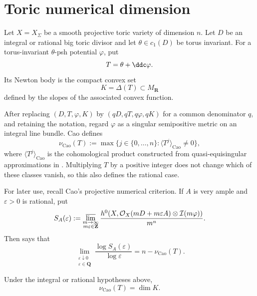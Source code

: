 \section{Toric numerical dimension}
\label{sec:verified-toric-dimension}

Let \(X=X_\Sigma\) be a smooth projective toric variety of dimension
\(n\). Let \(D\) be an integral or rational big toric divisor and let
\(\theta\in c_1(D)\) be torus invariant. For a torus-invariant
\(\theta\)-psh potential \(\varphi\), put
\[
                         T=\theta+\ddc\varphi.
\]
Its Newton body is the compact convex set
\[
                         K=\Delta(T)\subset M_{\mathbf R}
\tag{69.25}\label{eq:verified-newton-body}
\]
defined by the slopes of the associated convex function.

\begin{definition}
\label{def:verified-cao-dimension}
After replacing \((D,T,\varphi,K)\) by
\((qD,qT,q\varphi,qK)\) for a common denominator \(q\), and retaining
the notation, regard \(\varphi\) as a singular semipositive metric on
an integral line bundle. Cao defines
\[
 \nu_{\mathrm{Cao}}(T)
   :=\max\bigl\{j\in\{0,\ldots,n\}:
       \langle T^j\rangle_{\mathrm{Cao}}\ne0\bigr\},
\]
where \(\langle T^j\rangle_{\mathrm{Cao}}\) is the cohomological
product constructed from quasi-equisingular approximations in
\cite[Definitions~3--4]{Cao14}. Multiplying \(T\) by a positive
integer does not change which of these classes vanish, so this also
defines the rational case.
\end{definition}

For later use, recall Cao's projective numerical criterion. If \(A\)
is very ample and \(\varepsilon>0\) is rational, put
\[
 S_A(\varepsilon)
 :=\varlimsup_{\substack{m\to\infty\\m\varepsilon\in\mathbf Z}}
 \frac{h^0\!\left(X,
   \mathcal O_X(mD+m\varepsilon A)\otimes
   \mathcal I(m\varphi)\right)}{m^n}.
\]
Then \cite[Proposition~4.4]{Cao14} says that
\[
 \lim_{\substack{\varepsilon\downarrow0\\
                  \varepsilon\in\mathbf Q}}
       \frac{\log S_A(\varepsilon)}{\log\varepsilon}
       =n-\nu_{\mathrm{Cao}}(T).
\tag{69.26}\label{eq:verified-cao-characterization}
\]

\begin{theorem}\label{thm:verified-toric-dimension}
Under the integral or rational hypotheses above,
\[
                          \nu_{\mathrm{Cao}}(T)=\dim K.
\tag{69.27}\label{eq:verified-toric-dimension}
\]
\end{theorem}

